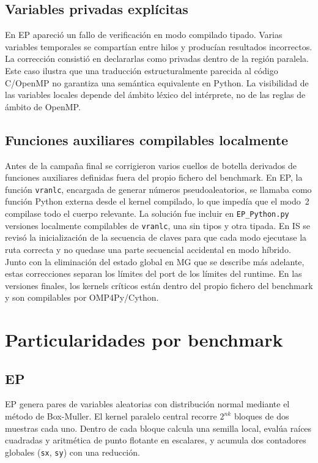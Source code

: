 \subsection{Variables privadas explícitas}
En EP apareció un fallo de verificación en modo compilado tipado. Varias
variables temporales se compartían entre hilos y producían resultados
incorrectos. La corrección consistió en declararlas como privadas dentro de la
región paralela. Este caso ilustra que una traducción estructuralmente parecida
al código C/OpenMP no garantiza una semántica equivalente en Python. La
visibilidad de las variables locales depende del ámbito léxico del intérprete,
no de las reglas de ámbito de OpenMP.

\subsection{Funciones auxiliares compilables localmente}
Antes de la campaña final se corrigieron varios cuellos de botella derivados de
funciones auxiliares definidas fuera del propio fichero del benchmark. En EP, la
función \texttt{vranlc}, encargada de generar números pseudoaleatorios, se
llamaba como función Python externa desde el kernel compilado, lo que impedía
que el modo~2 compilase todo el cuerpo relevante. La solución fue incluir en
\texttt{EP\_Python.py} versiones localmente compilables de \texttt{vranlc}, una
sin tipos y otra tipada. En IS se revisó la inicialización de la secuencia de
claves para que cada modo ejecutase la ruta correcta y no quedase una parte
secuencial accidental en modo híbrido. Junto con la eliminación del estado
global en MG que se describe más adelante, estas correcciones separan los
límites del port de los límites del runtime. En las versiones finales, los
kernels críticos están dentro del propio fichero del benchmark y son compilables
por OMP4Py/Cython.


\section{Particularidades por benchmark}
\label{sec:particularidades-benchmarks}

\subsection{EP}
EP genera pares de variables aleatorias con distribución normal mediante el
método de Box-Muller. El kernel paralelo central recorre $2^{nk}$ bloques de
dos muestras cada uno. Dentro de cada bloque calcula una semilla local, evalúa
raíces cuadradas y aritmética de punto flotante en escalares, y acumula dos
contadores globales (\texttt{sx}, \texttt{sy}) con una reducción.


